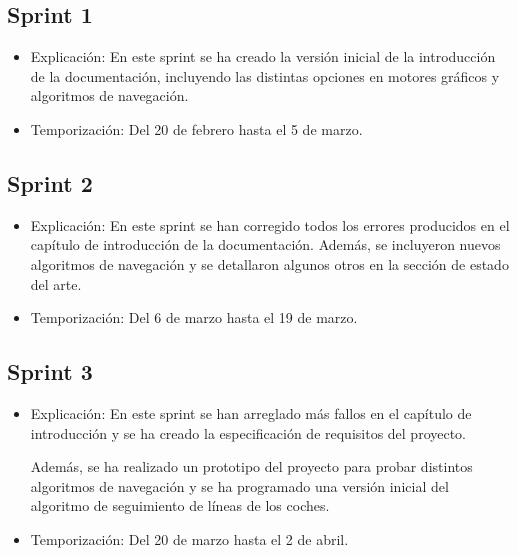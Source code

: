 \subsection{Sprint 1}
\begin{itemize}
    \item Explicación: En este sprint se ha creado la versión inicial de la introducción de la documentación, incluyendo las distintas opciones en motores gráficos y algoritmos de navegación.

    \item Temporización: Del 20 de febrero hasta el 5 de marzo.
\end{itemize}

\subsection{Sprint 2}
\begin{itemize}
    \item Explicación: En este sprint se han corregido todos los errores producidos en el capítulo de introducción de la documentación. Además, se incluyeron nuevos algoritmos de navegación y se detallaron algunos otros en la sección de estado del arte.
    \item Temporización: Del 6 de marzo hasta el 19 de marzo. 
\end{itemize}

\subsection{Sprint 3}
\begin{itemize}
    \item Explicación: En este sprint se han arreglado más fallos en el capítulo de introducción y se ha creado la especificación de requisitos del proyecto.
    
    Además, se ha realizado un prototipo del proyecto para probar distintos algoritmos de navegación y se ha programado una versión inicial del algoritmo de seguimiento de líneas de los coches.
    \item Temporización: Del 20 de marzo hasta el 2 de abril.
\end{itemize}


